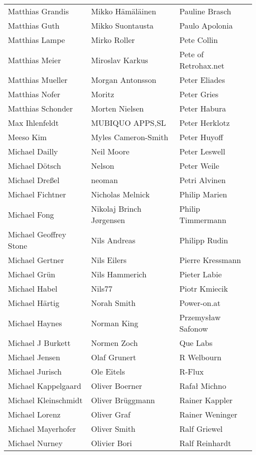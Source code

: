 \begin{tabular}{p{4.5cm}p{4.5cm}p{4.5cm}}
Matthias Grandis & Mikko Hämäläinen & Pauline Brasch \\
Matthias Guth & Mikko Suontausta & Paulo Apolonia \\
Matthias Lampe & Mirko Roller & Pete Collin \\
Matthias Meier & Miroslav Karkus & Pete of Retrohax.net \\
Matthias Mueller & Morgan Antonsson & Peter Eliades \\
Matthias Nofer & Moritz & Peter Gries \\
Matthias Schonder & Morten Nielsen & Peter Habura \\
Max Ihlenfeldt & MUBIQUO APPS,SL & Peter Herklotz \\
Meeso Kim & Myles Cameron-Smith & Peter Huyoff \\
Michael Dailly & Neil Moore & Peter Leswell \\
Michael Dötsch & Nelson & Peter Weile \\
Michael Dreßel & neoman & Petri Alvinen \\
Michael Fichtner & Nicholas Melnick & Philip Marien \\
Michael Fong & Nikolaj Brinch Jørgensen & Philip Timmermann \\
Michael Geoffrey Stone & Nils Andreas & Philipp Rudin \\
Michael Gertner & Nils Eilers & Pierre Kressmann \\
Michael Grün & Nils Hammerich & Pieter Labie \\
Michael Habel & Nils77 & Piotr Kmiecik \\
Michael Härtig & Norah Smith & Power-on.at \\
Michael Haynes & Norman King & Przemysław Safonow \\
Michael J Burkett & Normen Zoch & Que Labs \\
Michael Jensen & Olaf Grunert & R Welbourn \\
Michael Jurisch & Ole Eitels & R-Flux \\
Michael Kappelgaard & Oliver Boerner & Rafał Michno \\
Michael Kleinschmidt & Oliver Brüggmann & Rainer Kappler \\
Michael Lorenz & Oliver Graf & Rainer Weninger \\
Michael Mayerhofer & Oliver Smith & Ralf Griewel \\
Michael Nurney & Olivier Bori & Ralf Reinhardt \\

\end{tabular}
